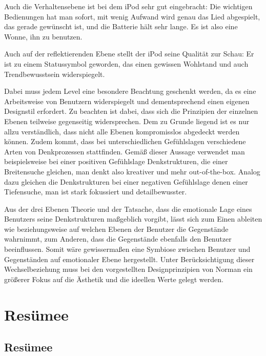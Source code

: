 \documentclass[parskip,headsepline, headtopline, %
footsepline, oneside, 12pt, headings=small]{scrreprt}
\begin{document}
Auch die Verhaltensebene ist bei dem iPod sehr gut eingebracht: Die wichtigen Bedienungen hat man sofort, mit wenig Aufwand wird genau das Lied abgespielt, das gerade gewünscht ist, und die Batterie hält sehr lange. Es ist also eine Wonne, ihn zu benutzen.

Auch auf der reflektierenden Ebene stellt der iPod seine Qualität zur Schau: Er ist zu einem Statussymbol geworden, das einen gewissen Wohlstand und auch Trendbewusstsein widerspiegelt. 


Dabei muss jedem Level eine besondere Beachtung geschenkt werden, da es eine Arbeitsweise von Benutzern widerspiegelt und dementsprechend einen eigenen Designstil erfordert. Zu beachten ist dabei, dass sich die Prinzipien der einzelnen Ebenen teilweise gegenseitig widersprechen. Dem zu Grunde liegend ist es nur allzu verständlich, dass nicht alle Ebenen kompromisslos abgedeckt werden können. 
Zudem kommt, dass bei unterschiedlichen Gefühlslagen verschiedene Arten von Denkprozessen stattfinden. Gemäß dieser Aussage verwendet man beispielsweise bei einer positiven Gefühlslage Denkstrukturen, die einer Breitensuche gleichen, man denkt also kreativer und mehr out-of-the-box. Analog dazu gleichen die Denkstrukturen bei einer negativen Gefühlslage denen einer Tiefensuche, man ist stark fokussiert und detailbewusster.

Aus der drei Ebenen Theorie und der Tatsache, dass die emotionale Lage eines Benutzers seine Denkstrukturen maßgeblich vorgibt, lässt sich zum Einen ableiten wie beziehungsweise auf welchen Ebenen der Benutzer die Gegenstände wahrnimmt, zum Anderen, dass die Gegenstände ebenfalls den Benutzer beeinflussen. Somit wäre gewissermaßen eine Symbiose zwischen Benutzer und Gegenständen auf emotionaler Ebene hergestellt. Unter Berücksichtigung dieser Wechselbeziehung muss bei den vorgestellten Designprinzipien von Norman ein größerer Fokus auf die Ästhetik und die ideellen Werte gelegt werden.

 
\chapter{Resümee}
\section{Resümee}
\end{document}
